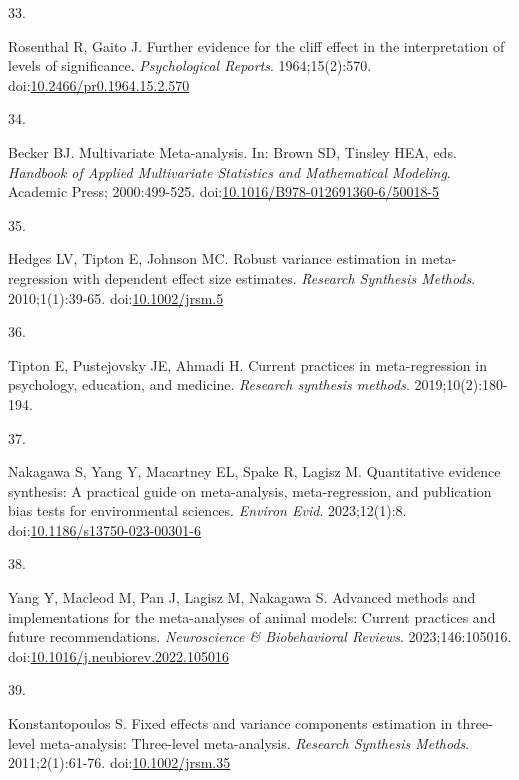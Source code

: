 \documentclass[
  american,
  man, donotrepeattitle,floatsintext]{apa7}
\newlength{\cslhangindent}
\newlength{\csllabelwidth}
\newenvironment{CSLReferences}[2] %
 {\begin{list}{}{%
  \setlength{\itemindent}{0pt}
  \setlength{\leftmargin}{0pt}
  \setlength{\parsep}{0pt}
  \ifodd #1
   \setlength{\leftmargin}{\cslhangindent}
   \setlength{\itemindent}{-1\cslhangindent}
  \fi
  \setlength{\itemsep}{#2\baselineskip}}}
 {\end{list}}
\newcommand{\CSLLeftMargin}[1]{\parbox[t]{\csllabelwidth}{\strut#1\strut}}
\newcommand{\CSLRightInline}[1]{\parbox[t]{\linewidth - \csllabelwidth}{\strut#1\strut}}
\begin{document}
\begin{CSLReferences}{0}{1}
\CSLLeftMargin{33. }%
\CSLRightInline{Rosenthal R, Gaito J. Further evidence for the cliff effect in the interpretation of levels of significance. \emph{Psychological Reports}. 1964;15(2):570. doi:\href{https://doi.org/10.2466/pr0.1964.15.2.570}{10.2466/pr0.1964.15.2.570}}

\CSLLeftMargin{34. }%
\CSLRightInline{Becker BJ. {Multivariate Meta-analysis}. In: Brown SD, Tinsley HEA, eds. \emph{Handbook of Applied Multivariate Statistics and Mathematical Modeling}. Academic Press; 2000:499-525. doi:\href{https://doi.org/10.1016/B978-012691360-6/50018-5}{10.1016/B978-012691360-6/50018-5}}

\CSLLeftMargin{35. }%
\CSLRightInline{Hedges LV, Tipton E, Johnson MC. {Robust variance estimation in meta-regression with dependent effect size estimates}. \emph{Research Synthesis Methods}. 2010;1(1):39-65. doi:\href{https://doi.org/10.1002/jrsm.5}{10.1002/jrsm.5}}

\CSLLeftMargin{36. }%
\CSLRightInline{Tipton E, Pustejovsky JE, Ahmadi H. Current practices in meta-regression in psychology, education, and medicine. \emph{Research synthesis methods}. 2019;10(2):180-194.}

\CSLLeftMargin{37. }%
\CSLRightInline{Nakagawa S, Yang Y, Macartney EL, Spake R, Lagisz M. Quantitative evidence synthesis: A practical guide on meta-analysis, meta-regression, and publication bias tests for environmental sciences. \emph{Environ Evid}. 2023;12(1):8. doi:\href{https://doi.org/10.1186/s13750-023-00301-6}{10.1186/s13750-023-00301-6}}

\CSLLeftMargin{38. }%
\CSLRightInline{Yang Y, Macleod M, Pan J, Lagisz M, Nakagawa S. Advanced methods and implementations for the meta-analyses of animal models: {Current} practices and future recommendations. \emph{Neuroscience \& Biobehavioral Reviews}. 2023;146:105016. doi:\href{https://doi.org/10.1016/j.neubiorev.2022.105016}{10.1016/j.neubiorev.2022.105016}}

\CSLLeftMargin{39. }%
\CSLRightInline{Konstantopoulos S. Fixed effects and variance components estimation in three-level meta-analysis: {Three}-level meta-analysis. \emph{Research Synthesis Methods}. 2011;2(1):61-76. doi:\href{https://doi.org/10.1002/jrsm.35}{10.1002/jrsm.35}}


\end{CSLReferences}
\end{document}

